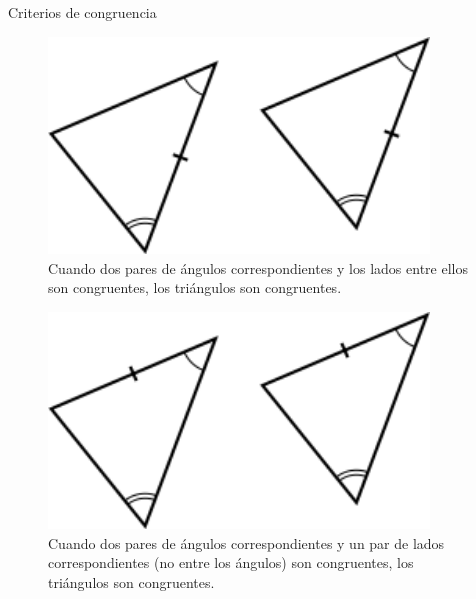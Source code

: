 \begin{notecard}{Criterios de congruencia}
\begin{tcbitemize}
        \tcbitem[adjusted title={Ángulo Lado Ángulo (ALA)}]
        \begin{figure}[H]
            \centering
            \includegraphics[width=0.9\textwidth]{../images/criterioALA}
            \caption{Cuando dos pares de ángulos correspondientes y los lados entre ellos son congruentes, los triángulos son congruentes.}
            \label{fig:criterioALA}
        \end{figure}

        \tcbitem[adjusted title={Ángulo Ángulo Lado (AAL)}]
        \begin{figure}[H]
            \centering
            \includegraphics[width=0.9\textwidth]{../images/criterioAAL}
            \caption{Cuando dos pares de ángulos correspondientes y un par de lados correspondientes (no entre los ángulos) son congruentes, los triángulos son congruentes.}
            \label{fig:criterioAAL}
        \end{figure}
    \end{tcbitemize}
\end{notecard}